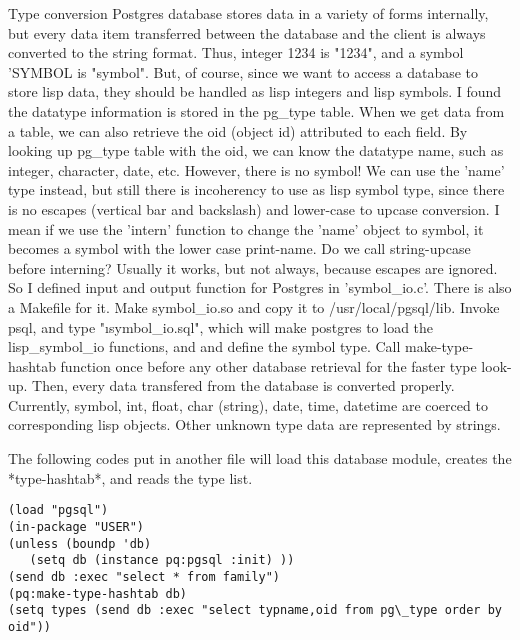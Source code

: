 \begin{description}
\item{Type conversion}
	Postgres database stores data in a variety of forms internally,
	but every data item transferred between the database and the client
	is always converted to the string format. Thus, integer 1234 is "1234",
	and a symbol 'SYMBOL is "symbol".  But, of course, since we want to
	access a database to store lisp data, they should be handled as
	lisp integers and lisp symbols.
	I found the datatype information is stored in the pg\_type table.
	When we get data from a table, we can also retrieve the oid (object id)
	attributed to each field.  By looking up pg\_type table with the oid,
	we can know the datatype name, such as integer, character, date, etc.
	However, there is no symbol!  We can use the 'name' type instead, 
	but still there is incoherency to use as lisp symbol type, since
	there is no escapes (vertical bar and backslash) and lower-case to
	upcase conversion.  I mean if we use the 'intern' function to
	change the 'name' object to symbol, it becomes a symbol with the
	lower case print-name.  Do we call string-upcase before interning?
	Usually it works, but not always, because escapes are ignored.
	So I defined input and output function for Postgres in 'symbol\_io.c'.
	There is also a Makefile for it.  Make symbol\_io.so and copy it
	to /usr/local/pgsql/lib.  Invoke psql, and type "\i symbol\_io.sql",
	which will make postgres to load the lisp\_symbol\_io functions, and
	and define the symbol type.
	Call make-type-hashtab function once before any other database retrieval
	for the faster type look-up.
	Then, every data transfered from the database is converted properly.
	Currently, symbol, int, float, char (string), date, time, datetime
	are coerced to corresponding lisp objects. Other unknown type data
	are represented by strings.
\end{description}

 The following codes put in another file will load this database module,
 creates the *type-hashtab*, and reads the type list.

\begin{verbatim}
(load "pgsql")
(in-package "USER")
(unless (boundp 'db)
   (setq db (instance pq:pgsql :init) ))
(send db :exec "select * from family")
(pq:make-type-hashtab db)
(setq types (send db :exec "select typname,oid from pg\_type order by oid"))
\end{verbatim}

